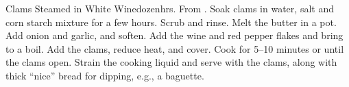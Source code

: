 \newpage
\begin{recipe}{Clams Steamed in White Wine}{\unit[1]{dozen}}{\unit[3]{hrs.}}
\freeform From \emph{}.
Soak clams in water, salt and corn starch mixture for a few hours.  Scrub and rinse.
Melt the butter in a pot.  Add onion and garlic, and soften.
Add the wine and red pepper flakes and bring to a boil.  Add the clams, reduce heat, and cover.  Cook for 5--10 minutes or until the clams open.  Strain the cooking liquid and serve with the clams, along with thick ``nice'' bread for dipping, e.g., a baguette.
\end{recipe}
